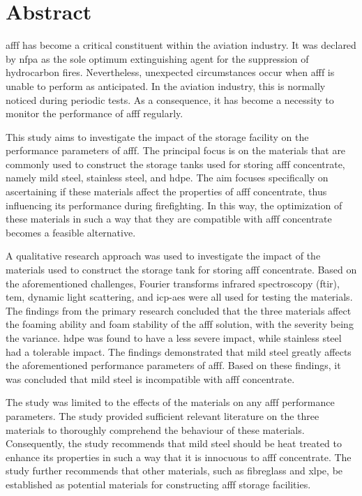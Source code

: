 \section*{Abstract}


\Acrfull{afff} has become a critical constituent within the aviation industry. It was declared by \Acrfull{nfpa} as the sole optimum extinguishing agent for the suppression of hydrocarbon fires. Nevertheless, unexpected circumstances occur when \acrshort{afff} is unable to perform as anticipated. In the aviation industry, this is normally noticed during periodic tests. As a consequence, it has become a necessity to monitor the performance of \acrshort{afff} regularly. 

This study aims to investigate the impact of the storage facility on the performance parameters of \acrshort{afff}. The principal focus is on the materials that are commonly used to construct the storage tanks used for storing \acrshort{afff} concentrate, namely mild steel, stainless steel, and \acrfull{hdpe}. The aim focuses specifically on ascertaining if these materials affect the properties of \acrshort{afff} concentrate, thus influencing its performance during firefighting. In this way, the optimization of these materials in such a way that they are compatible with \acrshort{afff} concentrate becomes a feasible alternative. 

A qualitative research approach was used to investigate the impact of the materials used to construct the storage tank for storing \acrshort{afff} concentrate. Based on the aforementioned challenges, Fourier transforms infrared spectroscopy (\acrshort{ftir}), \acrfull{tem}, dynamic light scattering, and \acrfull{icp-aes} were all used for testing the materials. The findings from the primary research concluded that the three materials affect the foaming ability and foam stability of the \acrshort{afff} solution, with the severity being the variance. \acrshort{hdpe} was found to have a less severe impact, while stainless steel had a tolerable impact. The findings demonstrated that mild steel greatly affects the aforementioned performance parameters of \acrshort{afff}. Based on these findings, it was concluded that mild steel is incompatible with \acrshort{afff} concentrate. 

The study was limited to the effects of the materials on any \acrshort{afff} performance parameters. The study provided sufficient relevant literature on the three materials to thoroughly comprehend the behaviour of these materials. Consequently, the study recommends that mild steel should be heat treated to enhance its properties in such a way that it is innocuous to \acrshort{afff} concentrate. The study further recommends that other materials, such as fibreglass and \acrfull{xlpe}, be established as potential materials for constructing \acrshort{afff} storage facilities.
